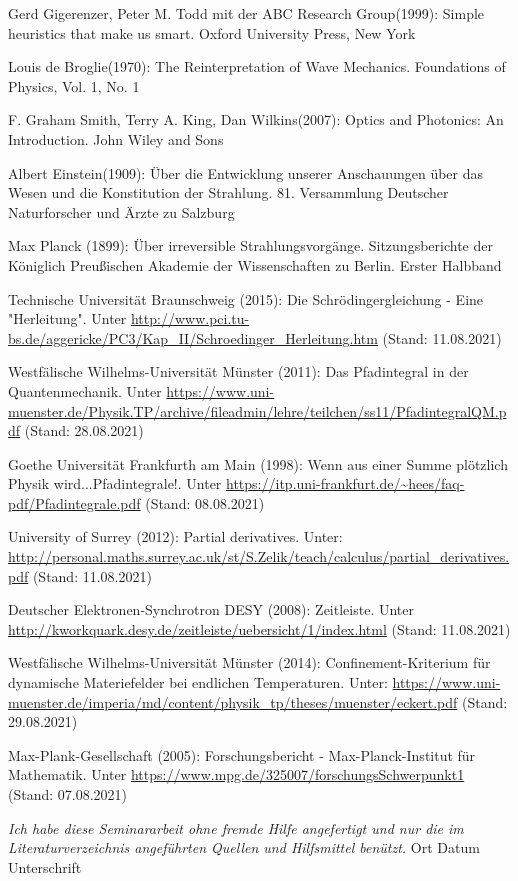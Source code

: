 \documentclass[12pt,oneside, a4paper]{scrbook}
\begin{document}
\begin{thebibliography}{1}
\bibitem{}
Gerd Gigerenzer, Peter M. Todd mit der ABC Research Group(1999): Simple heuristics that make us smart. Oxford University Press, New York

\bibitem{}
Louis de Broglie(1970): The Reinterpretation of Wave Mechanics. Foundations of Physics, Vol. 1, No. 1

\bibitem{}
F. Graham Smith, Terry A. King, Dan Wilkins(2007): Optics and Photonics: An Introduction. John Wiley and Sons

\bibitem{}
Albert Einstein(1909): Über die Entwicklung unserer Anschauungen über das Wesen und die Konstitution der Strahlung. 81. Versammlung Deutscher Naturforscher und Ärzte zu Salzburg

\bibitem{}
Max Planck (1899): Über irreversible Strahlungsvorgänge. Sitzungsberichte der Königlich Preußischen Akademie der Wissenschaften zu Berlin. Erster Halbband

\end{thebibliography}

\renewcommand\bibname{Internet Literatur}

\begin{thebibliography}{2}

\bibitem{}
Technische Universität Braunschweig (2015): Die Schrödingergleichung - Eine "Herleitung". Unter \url{http://www.pci.tu-bs.de/aggericke/PC3/Kap_II/Schroedinger_Herleitung.htm} (Stand: 11.08.2021)

\bibitem{}
Westfälische Wilhelms-Universität Münster (2011): Das Pfadintegral in der Quantenmechanik. Unter \url{https://www.uni-muenster.de/Physik.TP/archive/fileadmin/lehre/teilchen/ss11/PfadintegralQM.pdf} (Stand: 28.08.2021)

\bibitem{}
Goethe Universität Frankfurth am Main (1998): Wenn aus einer Summe plötzlich Physik wird...Pfadintegrale!. Unter \url{https://itp.uni-frankfurt.de/~hees/faq-pdf/Pfadintegrale.pdf} (Stand: 08.08.2021)

\bibitem{}
University of Surrey (2012): Partial derivatives. Unter: \url{http://personal.maths.surrey.ac.uk/st/S.Zelik/teach/calculus/partial_derivatives.pdf} (Stand: 11.08.2021)

\bibitem{}
Deutscher Elektronen-Synchrotron DESY (2008): Zeitleiste. Unter \url{http://kworkquark.desy.de/zeitleiste/uebersicht/1/index.html} (Stand: 11.08.2021)

\bibitem{}
Westfälische Wilhelms-Universität Münster (2014): Confinement-Kriterium für dynamische Materiefelder bei endlichen Temperaturen. Unter: \url{https://www.uni-muenster.de/imperia/md/content/physik_tp/theses/muenster/eckert.pdf} (Stand: 29.08.2021)

\bibitem{} 
Max-Plank-Gesellschaft (2005): Forschungsbericht - Max-Planck-Institut für Mathematik. Unter \url{https://www.mpg.de/325007/forschungsSchwerpunkt1} (Stand: 07.08.2021)

\end{thebibliography}


\newpage
\thispagestyle{plain}
\begin{center}
\textit{Ich habe diese Seminararbeit ohne fremde Hilfe angefertigt und nur die im Literaturverzeichnis angeführten Quellen und Hilfsmittel benützt.}
\newline
\newline
Ort \qquad\qquad\qquad Datum \qquad\qquad\qquad Unterschrift
\end{center}

\newpage
\end{document}
